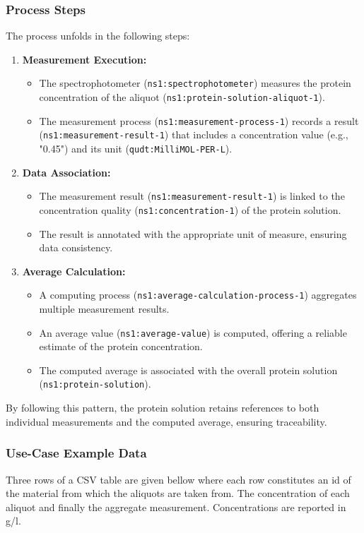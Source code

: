 \subsubsection{Process Steps}
The process unfolds in the following steps:
\begin{enumerate}[noitemsep]
    \item \textbf{Measurement Execution:}
    \begin{itemize}[noitemsep]
        \item The spectrophotometer (\texttt{ns1:spectrophotometer}) measures the protein concentration of the aliquot (\texttt{ns1:protein-solution-aliquot-1}).
        \item The measurement process (\texttt{ns1:measurement-process-1}) records a result (\texttt{ns1:measurement-result-1}) that includes a concentration value (e.g., "0.45") and its unit (\texttt{qudt:MilliMOL-PER-L}).
    \end{itemize}
    \item \textbf{Data Association:}
    \begin{itemize}[noitemsep]
        \item The measurement result (\texttt{ns1:measurement-result-1}) is linked to the concentration quality (\texttt{ns1:concentration-1}) of the protein solution.
        \item The result is annotated with the appropriate unit of measure, ensuring data consistency.
    \end{itemize}
    \item \textbf{Average Calculation:}
    \begin{itemize}[noitemsep]
        \item A computing process (\texttt{ns1:average-calculation-process-1}) aggregates multiple measurement results.
        \item An average value (\texttt{ns1:average-value}) is computed, offering a reliable estimate of the protein concentration.
        \item The computed average is associated with the overall protein solution (\texttt{ns1:protein-solution}).
    \end{itemize}
\end{enumerate}

By following this pattern, the protein solution retains references to both individual measurements and the computed average, ensuring traceability. 


\subsubsection*{Use-Case Example Data}
Three rows of a CSV table are given bellow where each row constitutes an id of the material from which the aliquots are taken from. The concentration of each aliquot and finally the aggregate measurement. 
Concentrations are reported in g/l.

